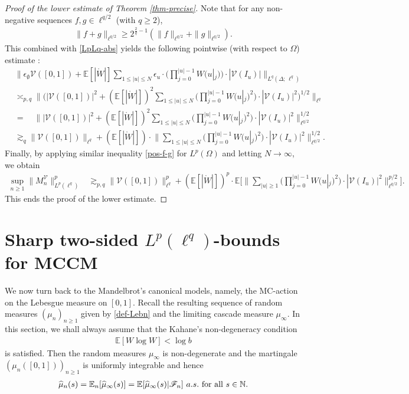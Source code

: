 \documentclass[12pt]{amsart}
\theoremstyle{definition}
\theoremstyle{remark}
\newcommand{\N}{\mathbb{N}}
\newcommand{\E}{\mathbb{E}}
\numberwithin{equation}{section}
\begin{document}
\begin{proof}[Proof of the lower estimate of Theorem \ref{thm-precise}]
Note that  for any non-negative sequences $f, g \in \ell^{q/2}$ (with $q\ge 2$), 
 \begin{align}\label{pos-f-g}
 \| f+ g\|_{\ell^{q/2}} \ge 2^{\frac{2}{q}-1} (\| f\|_{\ell^{q/2}} + \| g\|_{\ell^{q/2}}).
 \end{align}
 This combined with  \eqref{LpLq-abs}  yields the following pointwise (with respect to $\Omega$) estimate  : 
\begin{align*}
&  \Big\| \epsilon_\emptyset \mathcal{V}([0,1]) +  \E[|\mathring{W}|] \sum_{1\le |u|\le N}  \epsilon_u   \cdot \Big(  \prod_{j=0}^{|u|-1} W(u|_j) \Big)  \cdot |\mathcal{V}(I_u) |  \Big\|_{L^q( \Delta; \, \ell^q)}
 \\
&\asymp_{p,q}    \Big\|  \Big ( |\mathcal{V}([0,1])|^2 +  (\E[|\mathring{W}|])^2 \sum_{1\le |u|\le N}   \Big(  \prod_{j=0}^{|u|-1} W(u|_j)^2 \Big)  \cdot |\mathcal{V}(I_u) |^2 \Big)^{1/2}\Big\|_{\ell^q}
\\
&=  \quad  \Big\|   |\mathcal{V}([0,1])|^2 +  (\E[|\mathring{W}|])^2 \sum_{1\le |u|\le N}   \Big(  \prod_{j=0}^{|u|-1} W(u|_j)^2 \Big)  \cdot |\mathcal{V}(I_u) |^2  \Big\|_{\ell^{q/2}}^{1/2}
\\
& \gtrsim_{q}  \| \mathcal{V}([0,1])\|_{\ell^q} +   (\E[|\mathring{W}|]) \cdot  \Big\|    \sum_{1\le |u|\le N}   \Big(  \prod_{j=0}^{|u|-1} W(u|_j)^2 \Big)  \cdot |\mathcal{V}(I_u) |^2  \Big\|_{\ell^{q/2}}^{1/2} . 
 \end{align*}
Finally, by applying similar inequality \eqref{pos-f-g} for $L^p(\Omega)$ and letting $N\to\infty$, we obtain 
 \begin{align*}
  \sup_{n\ge 1}\|M_n^\mathcal{V}\|_{L^p(\ell^q)}^p  &  \gtrsim_{p,q}    \|\mathcal{V}([0,1])\|_{\ell^q}^p +    (\E[|\mathring{W}|])^p\cdot    \E\Big[ \Big\|   \sum_{ |u|\ge 1}   \Big(  \prod_{j=0}^{|u|-1} W(u|_j)^2 \Big)  \cdot |\mathcal{V}(I_u) |^2  \Big\|_{\ell^{q/2}}^{p/2}\Big]. 
 \end{align*}
 This ends the proof of the lower estimate. 
\end{proof}


\section{Sharp two-sided $L^p(\ell^q)$-bounds for MCCM}\label{sec-mccm}
We now turn back to the Mandelbrot's canonical models,  namely, the MC-action on the Lebesgue measure on $[0,1]$. Recall the resulting sequence of random measures $(\mu_n)_{n\ge 1}$ given by \eqref{def-Lebn} and the limiting cascade measure $\mu_\infty$.   In this section, we shall always assume  that the Kahane's non-degeneracy condition 
\begin{align}\label{K-cond}
\E[W\log W]<\log b
\end{align}
 is satisfied. Then the random measures $\mu_\infty$ is non-degenerate and the martingale $(\mu_n([0,1]))_{n\ge 1}$ is uniformly integrable and hence 
\begin{align}\label{mu-mart}
\widehat{\mu}_n(s)= \E_n[\widehat{\mu}_\infty(s)] = \E[\widehat{\mu}_\infty(s) |\mathscr{F}_n] \,\, a.s. \,\, \text{for all $  s\in \N$}. 
\end{align}
\end{document}
